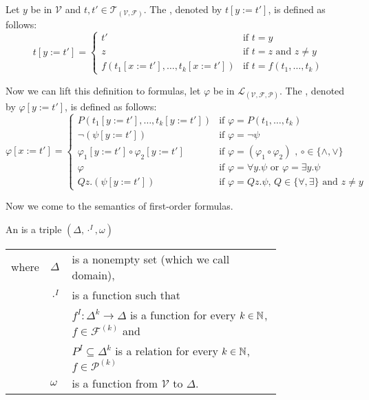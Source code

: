 \begin{definition}
	Let $y$ be in $\mathcal{V}$ and $t,t'\in\mathcal{T}_{(\mathcal{V},\mathcal{F})}$. The , denoted by $t\left[y:=t'\right]$, is defined as follows:
	\[t\left[y:=t'\right]=
		\begin{cases}
			t'                                                   & \text{if $t=y$}                \\ 
			z                                                    & \text{if $t=z$ and $z\neq y$}  \\%
			f(t_1\left[x:=t'\right],\dots,t_k\left[x:=t'\right]) & \text{if $t=f(t_1,\dots,t_k)$} 
		\end{cases}\]
	
	Now we can lift this definition to formulas, let $\varphi$ be in $\mathcal{L}_{(\mathcal{V},\mathcal{F},\mathcal{P})}$. The , denoted by $\varphi\left[y:=t'\right]$, is defined as follows:
	\[\varphi\left[x:=t'\right]=
		\begin{cases}
			P(t_1\left[y:=t'\right],\dots,t_k\left[y:=t'\right])        & \text{if $\varphi=P(t_1,\dots,t_k)$}                                     \\
			\neg(\psi\left[y:=t'\right])                                      & \text{if $\varphi=\neg\psi$}                                             \\ %
			\varphi_1\left[y:=t'\right]\circ\varphi_2\left[y:=t'\right] & \text{if $\varphi=(\varphi_1\circ\varphi_2)$ , $\circ\in\{\wedge,\vee\}$} \\
			\varphi                                                     & \text{if $\varphi=\forall y.\psi$ or $\varphi=\exists y.\psi$}                   \\
			Q z.(\psi\left[y:=t'\right])                                 & \text{if $\varphi=Q z.\psi$, $Q\in\{\forall,\exists\}$ and $z\neq y$}     
		\end{cases}\]

\end{definition}
Now we come to the semantics of first-order formulas.
\begin{definition}
	An  is a triple $(\Delta,\cdot^I,\omega)$
	\begin{tabular}{llp{0.78\linewidth}}
		where & $\Delta$  & is a nonempty set (which we call  domain),                                                     \\
& $\cdot^I$ & is a function such that                                                                        \\
&           & $f^I\colon\Delta^k\to\Delta$  is a function for every $k\in\mathbb{N}$, $f\in\mathcal{F}^{(k)}$ and \\
&           & $P^I\subseteq\Delta^k$ is a relation for every $k\in\mathbb{N}$, $f\in\mathcal{P}^{(k)}$       \\
& $\omega$  & is a function from $\mathcal{V}$ to $\Delta$.                                                  
	\end{tabular}
\end{definition}
